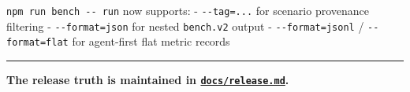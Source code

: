 \texttt{n\allowbreak{}p\allowbreak{}m\allowbreak{} \allowbreak{}r\allowbreak{}u\allowbreak{}n\allowbreak{} \allowbreak{}b\allowbreak{}e\allowbreak{}n\allowbreak{}c\allowbreak{}h\allowbreak{} \allowbreak{}-\allowbreak{}-\allowbreak{} \allowbreak{}r\allowbreak{}u\allowbreak{}n} now supports: - \texttt{-\allowbreak{}-\allowbreak{}t\allowbreak{}a\allowbreak{}g\allowbreak{}=\allowbreak{}.\allowbreak{}.\allowbreak{}.} for scenario provenance filtering - \texttt{-\allowbreak{}-\allowbreak{}f\allowbreak{}o\allowbreak{}r\allowbreak{}m\allowbreak{}a\allowbreak{}t\allowbreak{}=\allowbreak{}j\allowbreak{}s\allowbreak{}o\allowbreak{}n} for nested \texttt{b\allowbreak{}e\allowbreak{}n\allowbreak{}c\allowbreak{}h\allowbreak{}.\allowbreak{}v\allowbreak{}2} output - \texttt{-\allowbreak{}-\allowbreak{}f\allowbreak{}o\allowbreak{}r\allowbreak{}m\allowbreak{}a\allowbreak{}t\allowbreak{}=\allowbreak{}j\allowbreak{}s\allowbreak{}o\allowbreak{}n\allowbreak{}l} / \texttt{-\allowbreak{}-\allowbreak{}f\allowbreak{}o\allowbreak{}r\allowbreak{}m\allowbreak{}a\allowbreak{}t\allowbreak{}=\allowbreak{}f\allowbreak{}l\allowbreak{}a\allowbreak{}t} for agent-first flat metric records

\begin{center}\rule{0.5\linewidth}{0.5pt}\end{center}

\textbf{The release truth is maintained in \href{https://github.com/flyingrobots/bijou/blob/cbd70612140e7a450d764b3c7be1c6af878b99bc/docs/release.md}{\texttt{d\allowbreak{}o\allowbreak{}c\allowbreak{}s\allowbreak{}/\allowbreak{}r\allowbreak{}e\allowbreak{}l\allowbreak{}e\allowbreak{}a\allowbreak{}s\allowbreak{}e\allowbreak{}.\allowbreak{}m\allowbreak{}d}}.}

